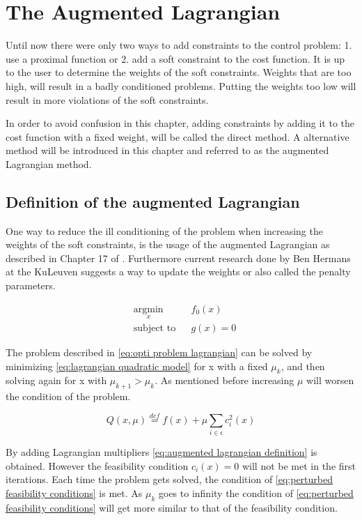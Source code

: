 \chapter{The Augmented Lagrangian}
Until now there were only two ways to add constraints to the control problem: 1. use a proximal function or 2. add a soft constraint to the cost function. It is up to the user to determine the weights of the soft constraints. Weights that are too high, will result in a badly conditioned problems. Putting the weights too low will result in more violations of the soft constraints.

In order to avoid confusion in this chapter, adding constraints by adding it to the cost function with a fixed weight, will be called the direct method. A alternative method will be introduced in this chapter and referred to as the augmented Lagrangian method.

\section{Definition of the augmented Lagrangian}
	One way to reduce the ill conditioning of the problem when increasing the weights of the soft constraints, is the usage of the augmented Lagrangian as described in Chapter 17 of \cite{Wright}. Furthermore current research done by Ben Hermans at the KuLeuven suggests a way to update the weights or also called the penalty parameters.
	
	\begin{equation}
		\begin{aligned}
			& \underset{x}{\text{argmin}}
			& & f_0(x) \\
			& \text{subject to}
			& & g(x)=0
		\end{aligned}
		\label{eq:opti problem lagrangian}
	\end{equation}
	
	The problem described in \eqref{eq:opti problem lagrangian} can be solved by minimizing \eqref{eq:lagrangian quadratic model}  for x with a fixed $\mu_k$, and then solving again for x with $\mu_{k+1}>\mu_k $. As mentioned before increasing $\mu$ will worsen the condition of the problem. 
	
	\begin{equation}
		Q(x,\mu) \overset{def}{=} f(x) + \mu \sum_{i \in \epsilon} c_i^2(x)
		\label{eq:lagrangian quadratic model}
	\end{equation}
	
	By adding Lagrangian multipliers \eqref{eq:augmented lagrangian definition} is obtained. However the feasibility condition $c_i(x)=0$ will not be met in the first iterations. Each time the problem gets solved, the condition of \eqref{eq:perturbed feasibility conditions} is met. As $\mu_k$ goes to infinity the condition of \eqref{eq:perturbed feasibility conditions} will get more similar to that of the feasibility condition.
	
